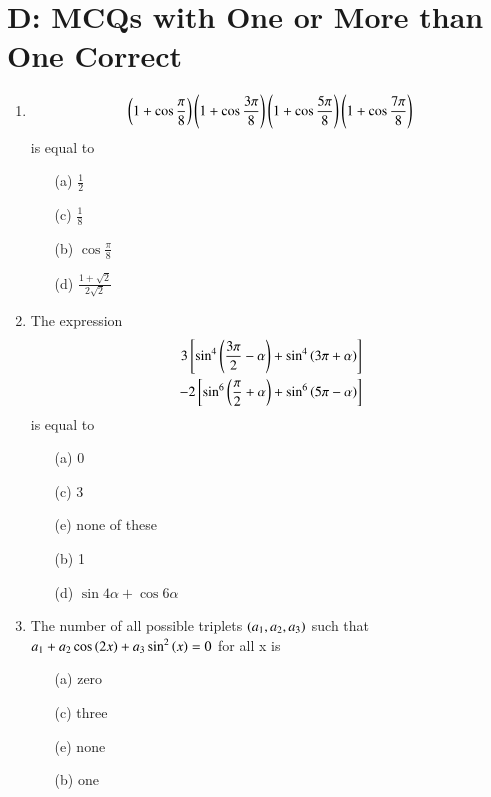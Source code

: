 \documentclass[journal,12pt,twocolumn,article]{IEEEtran}
\theoremstyle{remark}
\begin{document}
\section*{D: MCQs with One or More than One Correct}
\begin{enumerate}
\item 
\begin{multline*}
\left(1 + \cos\frac{\pi}{8}\right)\left(1 + \cos\frac{3\pi}{8}\right)\left(1 + \cos\frac{5\pi}{8}\right)\left(1 + \cos\frac{7\pi}{8}\right) 
\end{multline*}
is equal to
\hfill{}
\begin{multicols}{2}
\begin{enumerate}
\item[(a)] $\frac{1}{2}$
\item[(c)] $\frac{1}{8}$
\columnbreak
\item[(b)] $\cos \frac{\pi}{8}$
\item[(d)] $\frac{1+\sqrt{2}}{2\sqrt{2}}$
\end{enumerate}
\end{multicols}
\item The expression 
\begin{align*}
3{}\left[\sin^4\left(\frac{3\pi}{2} - \alpha\right) + \sin^4\left(3\pi + \alpha\right)\right]  \\ - 2{}\left[\sin^6\left(\frac{\pi}{2} + \alpha\right) + \sin^6\left(5\pi - \alpha\right)\right]
\end{align*}
is equal to
\hfill{}
\begin{multicols}{2}
\begin{enumerate}
\item[(a)] 0
\item[(c)] 3
\item[(e)] none of these
\columnbreak
\item[(b)] 1
\item[(d)] $\sin4\alpha + \cos6\alpha$
\end{enumerate}
\end{multicols}
\item The number of all possible triplets $\left(a_1, a_2, a_3\right)$ such that $a_1 + a_2 \cos\left(2x\right) + a_3\sin^2\left(x\right) = 0$ for all x is
\hfill{}
\begin{multicols}{2}
\begin{enumerate}
\item[(a)] zero
\item[(c)] three
\item[(e)] none
\columnbreak
\item[(b)] one

\end{enumerate}
\end{multicols}
\end{enumerate}
\end{document}
